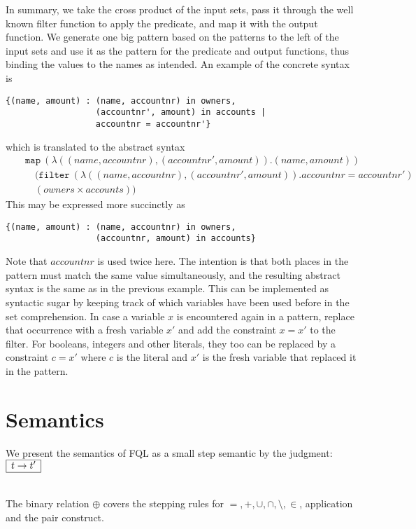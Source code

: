\documentclass[a4paper]{article}
\newcommand{\s}[1]{\mathtt{#1}}
\newcommand{\step}{\to}
\newcommand{\smbox}[1]{
  $\begin{array}{|c|}
    \hline
    #1 \\
    \hline
  \end{array}$
}
\begin{document}
In summary, we take the cross product of the input sets, pass it
through the well known filter function to apply the predicate,
and map it with the output function. We generate one big pattern
based on the patterns to the left of the input sets and use it as
the pattern for the predicate and output functions, thus binding
the values to the names as intended. An example of the concrete
syntax is
\begin{verbatim}
{(name, amount) : (name, accountnr) in owners,
                  (accountnr', amount) in accounts |
                  accountnr = accountnr'}
\end{verbatim}
which is translated to the abstract syntax
\begin{eqnarray*}
&&\s{map\ } (\lambda ((name, accountnr), (accountnr', amount)). (name, amount))\\
&&\quad(\s{filter\ } (\lambda ((name, accountnr), (accountnr', amount)). accountnr = accountnr')\\
&&\quad(owners \times accounts))
\end{eqnarray*}
This may be expressed more succinctly as
\begin{verbatim}
{(name, amount) : (name, accountnr) in owners,
                  (accountnr, amount) in accounts}
\end{verbatim}
Note that $accountnr$ is used twice here. The intention is that
both places in the pattern must match the same value
simultaneously, and the resulting abstract syntax is the same as
in the previous example. This can be implemented as syntactic sugar
by keeping track of which variables have been used before in the
set comprehension. In case a variable $x$ is encountered again in a
pattern, replace that occurrence with a fresh variable $x'$ and add
the constraint $x = x'$ to
the filter. For booleans, integers and other literals, they too can
be replaced by a constraint $c = x'$ where $c$ is the literal and
$x'$ is the fresh variable that replaced it in the pattern.



\section{Semantics}
\label{sec:semantics}

We present the semantics of FQL as a small step semantic by the judgment: \smbox{t \step t'}
\\
The binary relation $\oplus$ covers the stepping rules for $= ,+,\cup, \cap,\setminus,\in$, application and the pair construct.
\end{document}
